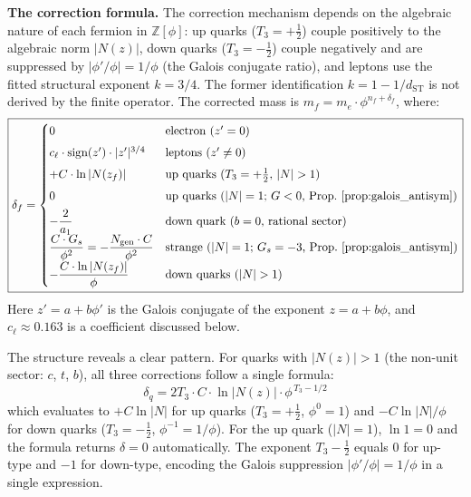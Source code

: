 \documentclass[12pt,a4paper]{article}
\theoremstyle{definition}
\begin{document}
\textbf{The correction formula.}  The correction mechanism depends on the algebraic nature of each fermion in $\mathbb{Z}[\phi]$: up quarks ($T_3 = +\tfrac{1}{2}$) couple positively to the algebraic norm $|N(z)|$, down quarks ($T_3 = -\tfrac{1}{2}$) couple negatively and are suppressed by $|\phi'/\phi| = 1/\phi$ (the Galois conjugate ratio), and leptons use the fitted structural exponent $k=3/4$.  The former identification $k=1-1/d_{\mathrm{ST}}$ is not derived by the finite operator.  The corrected mass is $m_f = m_e \cdot \phi^{n_f + \delta_f}$, where:
\begin{equation}
\boxed{\delta_f = \begin{cases}
0 & \text{electron (}z' = 0\text{)} \\[4pt]
c_\ell \cdot \mathrm{sign}(z') \cdot |z'|^{3/4} & \text{leptons (}z' \neq 0\text{)} \\[4pt]
+C \cdot \ln|N(z_f)| & \text{up quarks (}T_3 = +\tfrac{1}{2}\text{, } |N| > 1\text{)} \\[4pt]
0 & \text{up quarks (}|N| = 1\text{; }G < 0\text{, Prop.~\ref{prop:galois_antisym})} \\[4pt]
-\dfrac{2}{a_1} & \text{down quark (}b = 0\text{, rational sector)} \\[4pt]
\dfrac{C \cdot G_s}{\phi^2} = -\dfrac{N_{\text{gen}} \cdot C}{\phi^2} & \text{strange (}|N| = 1\text{; }G_s = -3\text{, Prop.~\ref{prop:galois_antisym})} \\[4pt]
-\dfrac{C \cdot \ln|N(z_f)|}{\phi} & \text{down quarks (}|N| > 1\text{)}
\end{cases}}
\label{eq:normlog}
\end{equation}
Here $z' = a + b\phi'$ is the Galois conjugate of the exponent $z = a + b\phi$, and $c_\ell \approx 0.163$ is a coefficient discussed below.

The structure reveals a clear pattern.  For quarks with $|N(z)| > 1$ (the non-unit sector: $c$, $t$, $b$), all three corrections follow a single formula:
\begin{equation}
\boxed{\delta_q = 2T_3 \cdot C \cdot \ln|N(z)| \cdot \phi^{\,T_3 - 1/2}}
\label{eq:unified_quark}
\end{equation}
which evaluates to $+C\ln|N|$ for up quarks ($T_3 = +\tfrac{1}{2}$, $\phi^0 = 1$) and $-C\ln|N|/\phi$ for down quarks ($T_3 = -\tfrac{1}{2}$, $\phi^{-1} = 1/\phi$).  For the up quark ($|N| = 1$), $\ln 1 = 0$ and the formula returns $\delta = 0$ automatically.  The exponent $T_3 - \tfrac{1}{2}$ equals $0$ for up-type and $-1$ for down-type, encoding the Galois suppression $|\phi'/\phi| = 1/\phi$ in a single expression.
\end{document}
